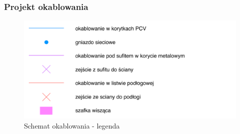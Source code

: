 \paragraph{}


\subsubsection{Projekt okablowania}
\begin{figure}[H]
  \begin{center}
    \includegraphics[width=\textwidth]{img/s/legenda.pdf}
    \caption{Schemat okablowania - legenda}
  \end{center}
\end{figure}


